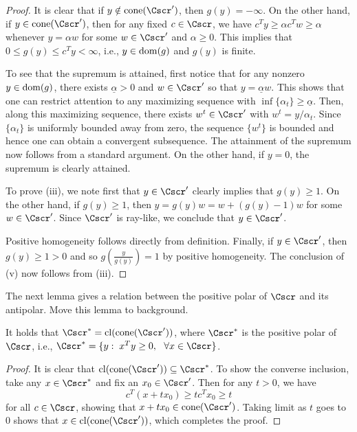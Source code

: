 \documentclass{siamltex}   %
\begin{document}
  \begin{proof}
    It is clear that if $y\notin {\rm cone}(\Cscr')$, then $g(y) = -\infty$. On the other hand, if $y\in {\rm cone}(\Cscr')$, then
    for any fixed $c\in \Cscr$, we have $c^Ty \ge \alpha c^Tw\ge \alpha$ whenever $y = \alpha w$ for some $w\in \Cscr'$ and $\alpha\ge 0$.
    This implies that $0\le g(y)\le c^Ty < \infty$, i.e., $y\in {\rm dom}(g)$ and $g(y)$ is finite.

    To see that the supremum is attained, first notice that for any nonzero $y\in {\rm dom}(g)$, there exists $\underline{\alpha}> 0$
    and $w\in \Cscr'$ so that $y = \underline{\alpha}w$. This shows that one can restrict attention to any maximizing sequence with $\inf\{\alpha_t\}\ge\underline{\alpha}$.
    Then, along this maximizing sequence, there exists $w^t\in \Cscr'$ with $w^t = y/\alpha_t$. Since $\{\alpha_t\}$ is uniformly bounded
    away from zero, the sequence $\{w^t\}$ is bounded and hence one
    can obtain a convergent subsequence. The attainment of the supremum now follows from a standard argument. On the other hand, if $y=0$, the
    supremum is clearly attained.

    To prove {\rm (iii)}, we note first that $y\in \Cscr'$ clearly implies that $g(y)\ge 1$. On the other hand, if $g(y)\ge 1$,
    then $y = g(y)w = w + (g(y)-1)w$ for some $w\in \Cscr'$. Since $\Cscr'$ is ray-like, we conclude that $y\in \Cscr'$.

    Positive homogeneity follows directly from definition. Finally, if $y\in \Cscr'$, then $g(y)\ge 1> 0$ and so
    $g(\frac{y}{g(y)})=1$ by positive homogeneity. The conclusion of {\rm (v)} now follows from {\rm (iii)}.
  \end{proof}

  The next lemma gives a relation between the positive polar of $\Cscr$ and its antipolar. {\color{red} Move this lemma to background.}

  \begin{lemma}\label{sec4:lem1}
    It holds that $\Cscr^* = {\rm cl}({\rm cone}(\Cscr'))$, where $\Cscr^*$ is the positive polar of $\Cscr$, i.e.,
    $\Cscr^* = \{y:\; x^Ty \ge 0,\ \ \forall x\in \Cscr\}$.
  \end{lemma}
  \begin{proof}
    It is clear that ${\rm cl}({\rm cone}(\Cscr'))\subseteq \Cscr^*$. To show the converse inclusion, take any $x\in \Cscr^*$ and fix an $x_0\in \Cscr'$.
    Then for any $t > 0$, we have
    \begin{equation*}
      c^T(x + tx_0) \ge tc^Tx_0\ge t
    \end{equation*}
    for all $c\in \Cscr$, showing that $x + tx_0\in {\rm cone}(\Cscr')$. Taking limit as $t$ goes to $0$ shows that $x\in {\rm cl}({\rm cone}(\Cscr'))$,
    which completes the proof.
  \end{proof}
\end{document}
